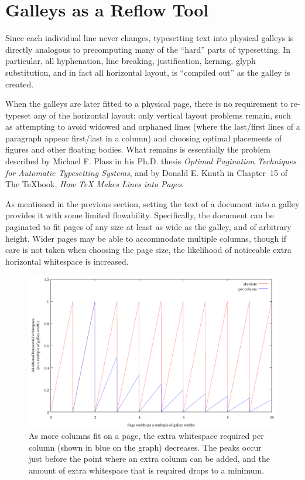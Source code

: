 \section{Galleys as a Reflow Tool}
\label{sec:singlegalleymetric}
Since each individual line never changes, typesetting text into physical galleys is directly analogous to precomputing many of the ``hard'' parts of typesetting. In particular, all hyphenation, line breaking, \gls{justification}, \gls{kerning}, \gls{glyph} substitution, and in fact all horizontal layout, is ``compiled out'' as the galley is created.

When the galleys are later fitted to a physical page, there is no requirement to re-typeset any of the horizontal layout: only vertical layout problems remain, such as attempting to avoid widowed and orphaned lines (where the last/\hspace{0pt}first lines of a paragraph appear first/\hspace{0pt}last in a column) and choosing optimal placements of figures and other floating bodies. What remains is essentially the problem described by Michael F. Plass in his Ph.D. thesis \emph{Optimal Pagination Techniques for Automatic Typesetting Systems},\hspace{0pt}\cite{Plass1981} and by Donald E. Knuth in Chapter~15 of The \TeX{}book, \emph{How \TeX{} Makes Lines into Pages}.\hspace{0pt}\cite{Knuth1984}

As mentioned in the previous section, setting the text of a document into a galley provides it with some limited flowability. Specifically, the document can be paginated to fit pages of any size at least as wide as the galley, and of arbitrary height. Wider pages may be able to accommodate multiple columns, though if care is not taken when choosing the page size, the likelihood of noticeable extra horizontal whitespace is increased.


\begin{figure}
 \includegraphics[height=0.5\textheight]{gnuplot/1col} %
 \caption[Extra whitespace in a single-galley document]{As more columns fit on a page, the extra whitespace required per column (shown in blue on the graph) decreases. The peaks occur just before the point where an extra column can be added, and the amount of extra whitespace that is required drops to a minimum.}
 \label{fig:sawtooth}
\end{figure}


